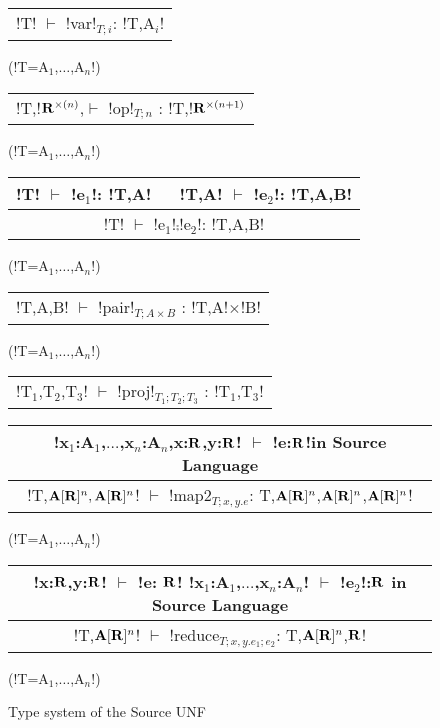 \begin{figure*}[tb]
    \centering
    \begin{tabular}{c} 
    \\\hline
    !T! $\vdash$ !var!$_{T;i}$: !T,A$_i$!
    \end{tabular}(!T=A$_{1}$,$\ldots$,A$_n$!)
    \hspace{0.5cm}
    \begin{tabular}{c}
        \\\hline
        !T,!$\mathbf{R}^{\times(n)}$,$\vdash$ !op!$_{T;n}$ : !T,!$\mathbf{R}^{\times(n+1)}$
    \end{tabular}(!T=A$_{1}$,$\ldots$,A$_n$!)

    \begin{tabular}{c}
    !T! $\vdash$ !e$_{1}$!: !T,A! $\quad$ !T,A! $\vdash$ !e$_{2}$!: !T,A,B! \\\hline
    !T! $\vdash$ !e$_{1}$!$\comp$!e$_{2}$!: !T,A,B!
    \end{tabular}(!T=A$_{1}$,$\ldots$,A$_n$!)

    \begin{tabular}{c}
        \\\hline
        !T,A,B! $\vdash$ !pair!$_{T;A\times B}$ : !T,A!$\times$!B!
    \end{tabular}(!T=A$_{1}$,$\ldots$,A$_n$!)

    \begin{tabular}{c}
        \\\hline
        !T$_{1}$,T$_{2}$,T$_{3}$! $\vdash$ !proj!$_{T_1;T_2;T_3}$ : !T$_{1}$,T$_{3}$!
    \end{tabular}

    \begin{tabular}{c}
        !x$_{1}$:A$_{1}$,$\ldots$,x$_n$:A$_n$,x:$\mathbf{R}$,y:$\mathbf{R}$! $\vdash$ !e:$\mathbf{R}$!\quad in Source Language
        \\\hline  
        !T,$\mathbf{A}[\mathbf{R}]^{n},\mathbf{A}[\mathbf{R}]^{n}$! $\vdash$ !map2$_{T; x,y.e}$: T,$\mathbf{A}[\mathbf{R}]^{n}$,$\mathbf{A}[\mathbf{R}]^{n}$,$\mathbf{A}[\mathbf{R}]^{n}$!
    \end{tabular}(!T=A$_{1}$,$\ldots$,A$_n$!)

    \begin{tabular}{c}
        !x:$\mathbf{R}$,y:$\mathbf{R}$! $\vdash$ !e: $\mathbf{R}$! \quad !x$_{1}$:A$_{1}$,$\ldots$,x$_n$:A$_n$! $\vdash$ !e$_{2}$!:$\mathbf{R}$ \quad in Source Language
        \\\hline  
        !T,$\mathbf{A}[\mathbf{R}]^{n}$! $\vdash$ !reduce$_{T; x,y.e_1; e_2}$: T,$\mathbf{A}[\mathbf{R}]^{n}$,$\mathbf{R}$!
    \end{tabular}(!T=A$_{1}$,$\ldots$,A$_n$!)
    \vspace{-0.2cm}
    \caption{Type system of the Source UNF}
    \vspace{-0.4cm}
    \label{fig:source_unf_typesystem}
\end{figure*}